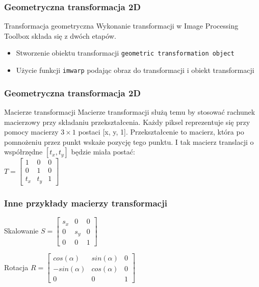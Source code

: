 \documentclass{beamer}
\begin{document}
\begin{frame}
\frametitle{Geometryczna transformacja 2D}

\begin{block}{Transformacja geometryczna}
Wykonanie transformacji w Image Processing Toolbox składa się z dwóch etapów.
\end{block}

\begin{itemize}
	\item Stworzenie obiektu transformacji \texttt{geometric transformation object}
	\item Użycie funkcji \texttt{imwarp} podając obraz do transformacji i obiekt transformacji
\end{itemize}
\end{frame}

\begin{frame}
\frametitle{Geometryczna transformacja 2D}
\begin{block}{Macierze transformacji}
Macierze transformacji służą temu by stosować rachunek macierzowy przy składaniu przekształcenia. Każdy piksel reprezentuje się przy pomocy macierzy $3 \times 1$ postaci [x, y, 1]. Przekształcenie to macierz, która po pomnożeniu przez punkt wskaże pozycję tego punktu. I tak macierz translacji o współrzędne $[t_x, t_y]$ będzie miała postać: \\
\centering
$T = \begin{bmatrix}
	1 & 0 & 0\\
	0 & 1 & 0\\
	t_x & t_y & 1
\end{bmatrix}$
\end{block}
\end{frame}

\begin{frame}
\frametitle{Inne przykłady macierzy transformacji}
\begin{block}{Skalowanie}
\centering
$S = \begin{bmatrix}
	s_x & 0 & 0\\
	0 & s_y & 0\\
	0 & 0 & 1
\end{bmatrix}$
\end{block}
\begin{block}{Rotacja}
\centering
$R = \begin{bmatrix}
	cos(\alpha) & sin(\alpha) & 0\\
	-sin(\alpha) & cos(\alpha) & 0\\
	0 & 0 & 1
\end{bmatrix}$
\end{block}
\end{frame}
\end{document}
